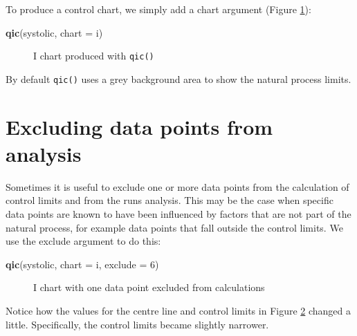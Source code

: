 \documentclass[
]{book}
\makeatletter
\newenvironment{Shaded}{\begin{snugshade}}{\end{snugshade}}
\newcommand{\AttributeTok}[1]{\textcolor[rgb]{0.13,0.29,0.53}{#1}}
\newcommand{\DecValTok}[1]{\textcolor[rgb]{0.00,0.00,0.81}{#1}}
\newcommand{\FunctionTok}[1]{\textcolor[rgb]{0.13,0.29,0.53}{\textbf{#1}}}
\newcommand{\NormalTok}[1]{#1}
\newcommand{\StringTok}[1]{\textcolor[rgb]{0.31,0.60,0.02}{#1}}
\newcommand*\pandocbounded[1]{%
  \sbox\pandoc@box{#1}%
  \Gscale@div\@tempa{\textheight}{\dimexpr\ht\pandoc@box+\dp\pandoc@box\relax}%
  \Gscale@div\@tempb{\linewidth}{\wd\pandoc@box}%
  \ifdim\@tempb\p@<\@tempa\p@\let\@tempa\@tempb\fi%
  \ifdim\@tempa\p@<\p@\scalebox{\@tempa}{\usebox\pandoc@box}%
  \else\usebox{\pandoc@box}%
  \fi%
}
\makeatother
\begin{document}
To produce a control chart, we simply add a chart argument (Figure \ref{fig:qicharts-qic2}):

\begin{Shaded}
\begin{Highlighting}[]
\FunctionTok{qic}\NormalTok{(systolic, }\AttributeTok{chart =} \StringTok{\textquotesingle{}i\textquotesingle{}}\NormalTok{)}
\end{Highlighting}
\end{Shaded}

\begin{figure}
\centering
\pandocbounded{}
\caption{\label{fig:qicharts-qic2}I chart produced with \texttt{qic()}}
\end{figure}

By default \texttt{qic()} uses a grey background area to show the natural process limits.

\section{Excluding data points from analysis}\label{excluding-data-points-from-analysis}

Sometimes it is useful to exclude one or more data points from the calculation of control limits and from the runs analysis. This may be the case when specific data points are known to have been influenced by factors that are not part of the natural process, for example data points that fall outside the control limits. We use the exclude argument to do this:

\begin{Shaded}
\begin{Highlighting}[]
\FunctionTok{qic}\NormalTok{(systolic, }\AttributeTok{chart =} \StringTok{\textquotesingle{}i\textquotesingle{}}\NormalTok{, }\AttributeTok{exclude =} \DecValTok{6}\NormalTok{)}
\end{Highlighting}
\end{Shaded}

\begin{figure}
\centering
\pandocbounded{}
\caption{\label{fig:qicharts-qic3}I chart with one data point excluded from calculations}
\end{figure}

Notice how the values for the centre line and control limits in Figure \ref{fig:qicharts-qic3} changed a little. Specifically, the control limits became slightly narrower.
\end{document}
